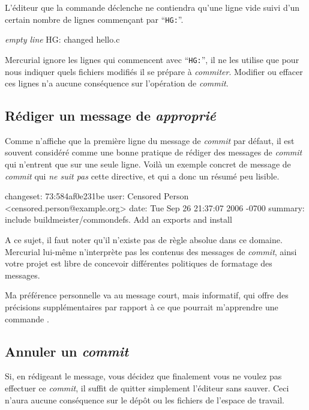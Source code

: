 L'éditeur que la commande  déclenche ne contiendra
qu'une ligne vide suivi d'un certain nombre de lignes commençant
par ``\texttt{HG:}''.
\begin{codesample2}
  \emph{empty line}
  HG: changed hello.c
\end{codesample2}
Mercurial ignore les lignes qui commencent avec ``\texttt{HG:}'', il 
ne les utilise que pour nous indiquer quels fichiers modifiés il se 
prépare à \textit{commiter}. Modifier ou effacer ces lignes n'a 
aucune conséquence sur l'opération de \textit{commit}.

\subsection{Rédiger un message de \textit{approprié}}

Comme  n'affiche que la première ligne du message de
\textit{commit} par défaut, il est souvent considéré comme une bonne
pratique de rédiger des messages de \textit{commit} qui n'entrent que 
sur une seule ligne. Voilà un exemple concret de message de 
\textit{commit} qui \emph{ne suit pas} cette directive, et qui a donc
un résumé peu lisible.
\begin{codesample2}
  changeset:   73:584af0e231be
  user:        Censored Person <censored.person@example.org>
  date:        Tue Sep 26 21:37:07 2006 -0700
  summary:     include buildmeister/commondefs.   Add an exports and install
\end{codesample2}

A ce sujet, il faut noter qu'il n'existe pas de règle absolue dans ce 
domaine. Mercurial lui-même n'interprète pas les contenus des messages
de \textit{commit}, ainsi votre projet est libre de concevoir différentes
politiques de formatage des messages.

Ma préférence personnelle va au message court, mais informatif, qui offre
des précisions supplémentaires par rapport à ce que pourrait m'apprendre une commande
.

\subsection{Annuler un \textit{commit}}

Si, en rédigeant le message, vous décidez que finalement vous ne 
voulez pas effectuer ce \textit{commit}, il suffit de quitter simplement
l'éditeur sans sauver. Ceci n'aura aucune conséquence sur le dépôt ou
les fichiers de l'espace de travail.


